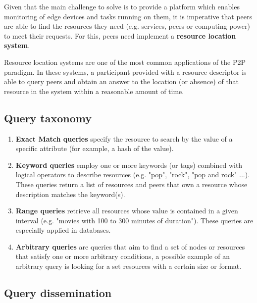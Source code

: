 

Given that the main challenge to solve is to provide a platform which enables monitoring of edge devices and tasks running on them, it is imperative that peers are able to find the resources they need (e.g. services, peers or computing power) to meet their requests. For this, peers need implement a \textbf{resource location system}.

Resource location systems are one of the most common applications of the P2P paradigm. In these systems, a participant provided with a resource descriptor is able to query peers and obtain an answer to the location (or absence) of that resource in the system within a reasonable amount of time. 

\subsection{Query taxonomy}

\begin{enumerate}
    \item \textbf{Exact Match queries} specify the resource to search by the value of a specific attribute (for example, a hash of the value).

    \item \textbf{Keyword queries} employ one or more keywords (or tags) combined with logical operators to describe resources (e.g. "pop", "rock", "pop and rock" ...). These queries return a list of resources and peers that own a resource whose description matches the keyword(s).
    
    \item \textbf{Range queries} retrieve all resources whose value is contained in a given interval (e.g. "movies with 100 to 300 minutes of duration"). These queries are especially applied in databases.
    
    \item \textbf{Arbitrary queries} are queries that aim to find a set of nodes or resources that satisfy one or more arbitrary conditions, a possible example of an arbitrary query is looking for a set resources with a certain size or format.
\end{enumerate}

\subsection{Query dissemination}

